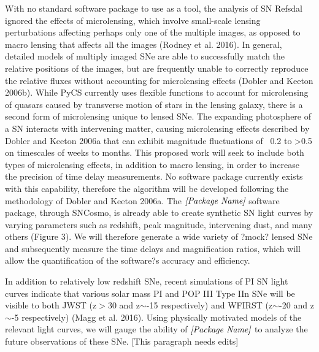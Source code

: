 With no standard software package to use as a tool, the analysis of SN Refsdal ignored the effects of microlensing, which involve small-scale lensing perturbations affecting perhaps only one of the multiple images, as opposed to macro lensing that affects all the images (Rodney et al. 2016). In general, detailed models of multiply imaged SNe are able to successfully match the relative positions of the images, but are frequently unable to correctly reproduce the relative fluxes without accounting for microlensing effects (Dobler and Keeton 2006b). While PyCS currently uses flexible functions to account for microlensing of quasars caused by transverse motion of stars in the lensing galaxy, there is a second form of microlensing unique to lensed SNe. The expanding photosphere of a SN interacts with intervening matter, causing microlensing effects described by Dobler and Keeton 2006a that can exhibit magnitude fluctuations of ~0.2 to >0.5 on timescales of weeks to months. This proposed work will seek to include both types of microlensing effects, in addition to macro lensing, in order to increase the precision of time delay measurements. No software package currently exists with this capability, therefore the algorithm will be developed following the methodology of Dobler and Keeton 2006a. 
The $\textit{[Package Name]}$ software package, through SNCosmo, is already able to create synthetic SN light curves by varying parameters such as redshift, peak magnitude, intervening dust, and many others (Figure 3). We will therefore generate a wide variety of ?mock? lensed SNe and subsequently measure the time delays and magnification ratios, which will allow the quantification of the software?s accuracy and efficiency. 

In addition to relatively low redshift SNe, recent simulations of PI SN light curves indicate that various solar mass PI and POP III Type IIn SNe will be visible to both JWST (z$>$30 and z$\sim$-15 respectively) and WFIRST (z$\sim$-20 and z$\sim$-5 respectively) (Magg et al. 2016). Using physically motivated models of the relevant light curves, we will gauge the ability of $\textit{[Package Name]}$ to analyze the future observations of these SNe. [This paragraph needs edits]


